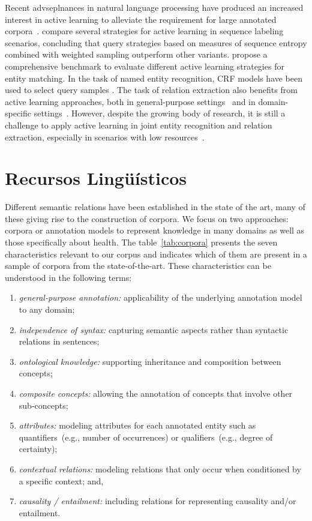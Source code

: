 Recent advseplnances in natural language processing have produced an increased interest in active learning to alleviate the requirement for large annotated corpora~\cite{Olsson2009ALS, Tchoua2019ActiveLY}.
\citet{settles2008analysis} compare several strategies for active learning in sequence labeling scenarios, concluding that query strategies based on measures of sequence entropy combined with weighted sampling outperform other variants.
\citet{Meduri2020ACB} propose a comprehensive benchmark to evaluate different active learning strategies for entity matching.
In the task of named entity recognition, CRF models have been used to select query samples
\citep{Claveau2017StrategiesTS, Lin2019AlpacaTagAA}.
The task of relation extraction also benefits from active learning approaches, both in general-purpose settings~\cite{fu2013efficient} and in domain-specific settings~\cite{zhang2012unified}.
However, despite the growing body of research, it is still a challenge to apply active learning in joint entity recognition and relation extraction, especially in scenarios with low resources~\cite{Gao2019ActiveER}.

  \section{Recursos Lingüísticos}

  Different semantic relations have been established  in the state of the art, many of these giving rise to the construction of corpora. We focus on two approaches: corpora or annotation models to represent knowledge in many domains as well as those specifically about health.
  The table~\ref{tab:corpora}  presents the seven characteristics relevant to our corpus and indicates which of them are present in a sample of corpora from the state-of-the-art.
  These characteristics can be understood in the following terms:
  \begin{enumerate}
  \item \textit{general-purpose annotation:} applicability of the underlying annotation model to any domain;
  \item \textit{independence of syntax:} capturing semantic aspects rather than syntactic relations in sentences;
  \item \textit{ontological knowledge:} supporting inheritance and composition between concepts;
  \item \textit{composite concepts:} allowing the annotation of concepts that involve other sub-concepts;
  \item \textit{attributes:} modeling attributes for each annotated entity such as quantifiers~(e.g., number of occurrences) or qualifiers~(e.g., degree of certainty);
  \item \textit{contextual relations:} modeling relations that only occur when conditioned by a specific context; and,
  \item \textit{causality / entailment:} including relations for representing causality and/or entailment.
  \end{enumerate}

